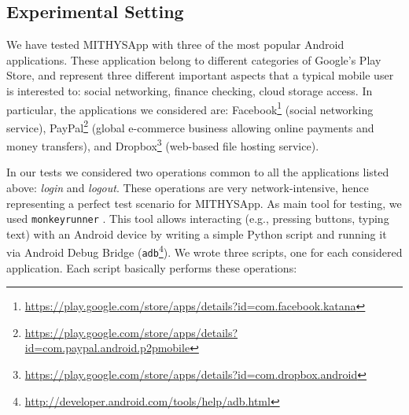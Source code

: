 \documentclass[english]{llncs}
\begin{document}
\vspace{-1.3cm}
\subsection{Experimental Setting}
\label{Experimental Setting}

We have tested MITHYSApp with three of the most popular Android applications. These application belong to different categories of Google's Play Store, and represent three different important aspects that a typical mobile user is interested to: social networking, finance checking, cloud storage access. In particular, the applications we considered are: Facebook\footnote{\url{https://play.google.com/store/apps/details?id=com.facebook.katana}} (social networking service), PayPal\footnote{\url{https://play.google.com/store/apps/details?id=com.paypal.android.p2pmobile}} (global e-commerce business allowing online payments and money transfers), and Dropbox\footnote{\url{https://play.google.com/store/apps/details?id=com.dropbox.android}} (web-based file hosting service).

In our tests we considered two operations common to all the applications listed above: \textit{login} and \textit{logout}. These operations are very network-intensive, hence representing a perfect test scenario for MITHYSApp.
As main tool for testing, we used \verb+monkeyrunner+ \cite{monkeyrunner_doc}. This tool allows interacting (e.g., pressing buttons, typing text) with an Android device by writing a simple Python script and running it via Android Debug Bridge (\verb+adb+\footnote{\url{http://developer.android.com/tools/help/adb.html}}). We wrote three scripts, one for each considered application. Each script basically performs these operations:
\end{document}
